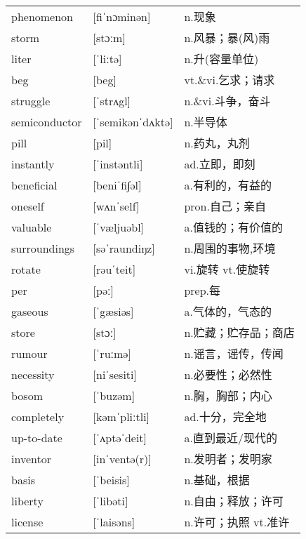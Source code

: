 \documentclass[a4paper]{article}
\begin{document}
\section{}
\begin{tabular}{l l l}

phenomenon & [fiˈnɔminən] & n.现象 \\
storm & [stɔːm] & n.风暴；暴(风)雨 \\
liter & [ˈliːtə] & n.升(容量单位) \\
beg & [beg] & vt.\&vi.乞求；请求 \\
struggle & [ˈstrʌgl] & n.\&vi.斗争，奋斗 \\
semiconductor & [ˈsemikənˈdʌktə] & n.半导体 \\
pill & [pil] & n.药丸，丸剂 \\
instantly & [ˈinstəntli] & ad.立即，即刻 \\
beneficial & [beniˈfi∫əl] & a.有利的，有益的 \\
oneself & [wʌnˈself] & pron.自己；亲自 \\
valuable & [ˈvæljuəbl] & a.值钱的；有价值的 \\
surroundings & [səˈraundiŋz] & n.周围的事物,环境 \\
rotate & [rəuˈteit] & vi.旋转 vt.使旋转 \\
per & [pəː] & prep.每 \\
gaseous & [ˈgæsiəs] & a.气体的，气态的 \\
store & [stɔː] & n.贮藏；贮存品；商店 \\
rumour & [ˈruːmə] & n.谣言，谣传，传闻 \\
necessity & [niˈsesiti] & n.必要性；必然性 \\
bosom & [ˈbuzəm] & n.胸，胸部；内心 \\
completely & [kəmˈpliːtli] & ad.十分，完全地 \\
up-to-date & [ˈʌptəˈdeit] & a.直到最近/现代的 \\
inventor & [inˈventə(r)] & n.发明者；发明家 \\
basis & [ˈbeisis] & n.基础，根据 \\
liberty & [ˈlibəti] & n.自由；释放；许可 \\
license & [ˈlaisəns] & n.许可；执照 vt.准许 \\

\end{tabular}
\end{document}
